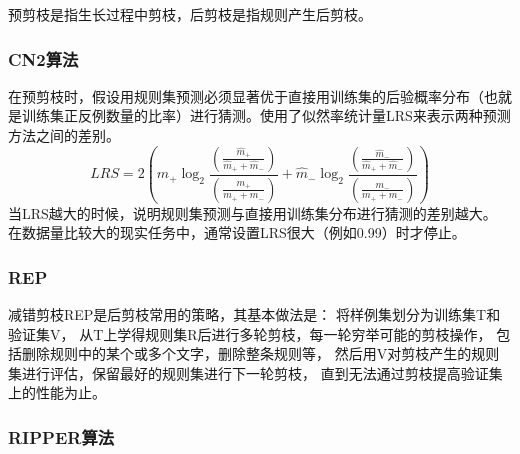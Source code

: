 \documentclass[UTF8]{article}
\begin{document}
    预剪枝是指生长过程中剪枝，后剪枝是指规则产生后剪枝。
\subsubsection{CN2算法}
    在预剪枝时，假设用规则集预测必须显著优于直接用训练集的后验概率分布（也就是训练集正反例数量的比率）进行猜测。使用了似然率统计量LRS来表示两种预测方法之间的差别。
    \begin{equation}
        LRS = 2(\hat{m}_+ \log_2{\frac{(\frac{\hat{m}_+}{\hat{m}_+ + \hat{m}_-})}{(\frac{m_+}{m_+ + m_-})}} + 
        \hat{m}_- \log_2{\frac{(\frac{\hat{m}_-}{\hat{m}_+ + \hat{m}_-})}{(\frac{m_-}{m_+ + m_-})}})
    \end{equation}
    当LRS越大的时候，说明规则集预测与直接用训练集分布进行猜测的差别越大。
    在数据量比较大的现实任务中，通常设置LRS很大（例如0.99）时才停止。
\subsubsection{REP}
    减错剪枝REP是后剪枝常用的策略，其基本做法是：
    将样例集划分为训练集T和验证集V，
    从T上学得规则集R后进行多轮剪枝，每一轮穷举可能的剪枝操作，
    包括删除规则中的某个或多个文字，删除整条规则等，
    然后用V对剪枝产生的规则集进行评估，保留最好的规则集进行下一轮剪枝，
    直到无法通过剪枝提高验证集上的性能为止。
\subsubsection{RIPPER算法}
    
\end{document}
